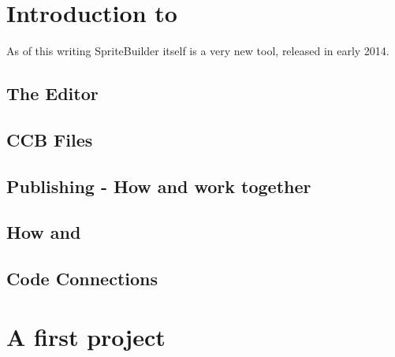 \section{Introduction to \SB{}}
As of this writing SpriteBuilder itself is a very new tool, released in early
2014.

\subsection{The Editor}
\subsection{CCB Files}
\subsection{Publishing - How \SB{} and \xcode work together}
\subsection{How \SB{} and \cocos{}}
\subsection{Code Connections}

\section{A first \SB project} 